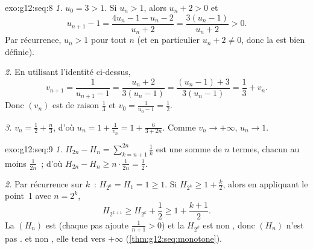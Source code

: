 \begin{solution}{exo:g12:seq:8}
\emph{1.} $u_0 = 3 > 1$. Si $u_n > 1$, alors $u_n + 2 > 0$ et
\[
u_{n+1} - 1 = \frac{4u_n - 1 - u_n - 2}{u_n + 2} = \frac{3(u_n - 1)}{u_n + 2} > 0 .
\]
Par récurrence, $u_n > 1$ pour tout $n$ (et en particulier
$u_n + 2 \neq 0$, donc la  est bien définie).

\emph{2.} En utilisant l'identité ci-dessus,
\[
v_{n+1} = \frac{1}{u_{n+1} - 1} = \frac{u_n + 2}{3(u_n - 1)}
= \frac{(u_n - 1) + 3}{3(u_n - 1)} = \frac{1}{3} + v_n .
\]
Donc $(v_n)$ est  de raison $\frac13$ et
$v_0 = \frac{1}{u_0 - 1} = \frac12$.

\emph{3.} $v_n = \frac12 + \frac{n}{3}$, d'où
$u_n = 1 + \frac{1}{v_n} = 1 + \frac{6}{3 + 2n}$. Comme
$v_n \to +\infty$, $u_n \to 1$.
\end{solution}

\begin{solution}{exo:g12:seq:9}
\emph{1.} $H_{2n} - H_n = \sum_{k=n+1}^{2n} \frac{1}{k}$ est une somme de
$n$ termes, chacun au moins $\frac{1}{2n}$~; d'où
$H_{2n} - H_n \geq n \cdot \frac{1}{2n} = \frac12$.

\emph{2.} Par récurrence sur $k$~: $H_{2^0} = H_1 = 1 \geq 1$. Si
$H_{2^k} \geq 1 + \frac{k}{2}$, alors en appliquant le point~1 avec
$n = 2^k$,
\[
H_{2^{k+1}} \geq H_{2^k} + \frac12 \geq 1 + \frac{k+1}{2}.
\]
La  $(H_n)$ est  (chaque pas ajoute $\frac{1}{n+1} > 0$) et
la  $H_{2^k}$ est non , donc $(H_n)$ n'est pas .
 et non , elle tend vers $+\infty$
(\cref{thm:g12:seq:monotone}).
\end{solution}

